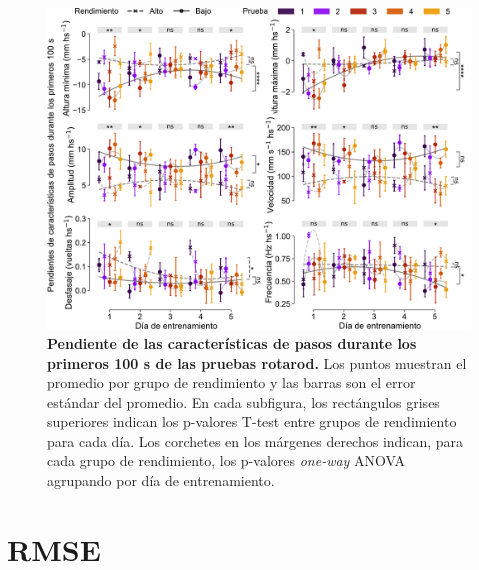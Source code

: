\begin{appendix}
    \begin{figure}[htbp]
        \centering
        \includegraphics[width=0.99\linewidth]{figuras/capitulo3/metricas_pendiente.pdf}
        \caption{\textbf{Pendiente de las características de pasos durante los primeros 100 s de las pruebas rotarod.} Los puntos muestran el promedio por grupo de rendimiento y las barras son el error estándar del promedio.
            En cada subfigura, los rectángulos grises superiores indican los p-valores T-test entre grupos de rendimiento para cada día.
            Los corchetes en los márgenes derechos indican, para cada grupo de rendimiento, los p-valores \textit{one-way} ANOVA agrupando por día de entrenamiento.}
        \label{fig:capitulo3_metricas_pendiente}
    \end{figure}

    \clearpage

    \section{RMSE}\label{sec:apendice_rmse}


\end{appendix}
